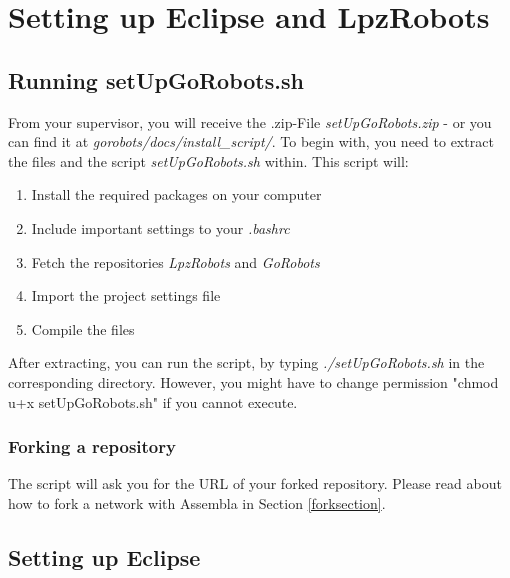 \section{Setting up Eclipse and LpzRobots}

\subsection{Running setUpGoRobots.sh}
From your supervisor, you will receive the .zip-File \emph{setUpGoRobots.zip} - or you can find it at \emph{gorobots/docs/install\_script/}. To begin with, you need to extract the files and the script \emph{setUpGoRobots.sh} within.
This script will:
\begin{enumerate}
 \item Install the required packages on your computer
 \item Include important settings to your \emph{.bashrc}
 \item Fetch the repositories \emph{LpzRobots} and \emph{GoRobots}
 \item Import the project settings file
 \item Compile the files
\end{enumerate}

After extracting, you can run the script, by typing \emph{./setUpGoRobots.sh} in the corresponding directory.
However, you might have to change permission "chmod u+x setUpGoRobots.sh" if you cannot execute.

\subsubsection{Forking a repository}
The script will ask you for the URL of your forked repository. Please read about how to fork a network with Assembla in Section \ref{forksection}.

\subsection{Setting up Eclipse}

